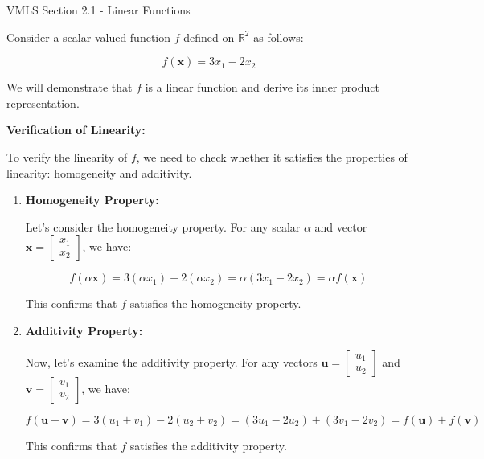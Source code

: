 \begin{notes}{VMLS Section 2.1 - Linear Functions}
\begin{highlight}
        Consider a scalar-valued function \(f\) defined on \(\mathbb{R}^2\) as follows:
        
        \[
        f(\mathbf{x}) = 3x_1 - 2x_2
        \]
        
        We will demonstrate that \(f\) is a linear function and derive its inner product representation.
        
        \vspace*{1em} \textbf{Verification of Linearity:} \vspace*{1em}
        
        To verify the linearity of \(f\), we need to check whether it satisfies the properties of linearity: homogeneity and additivity.
        
        \begin{enumerate}
            \item \textbf{Homogeneity Property:}
            
            Let's consider the homogeneity property. For any scalar \(\alpha\) and vector \(\mathbf{x} = \begin{bmatrix} x_1 \\ x_2 \end{bmatrix}\), we have:
            
            \[
            f(\alpha\mathbf{x}) = 3(\alpha x_1) - 2(\alpha x_2) = \alpha(3x_1 - 2x_2) = \alpha f(\mathbf{x})
            \]
            
            This confirms that \(f\) satisfies the homogeneity property.
            
            \item \textbf{Additivity Property:}
            
            Now, let's examine the additivity property. For any vectors \(\mathbf{u} = \begin{bmatrix} u_1 \\ u_2 \end{bmatrix}\) and \(\mathbf{v} = \begin{bmatrix} v_1 \\ v_2 \end{bmatrix}\), we have:
            
            \[
            f(\mathbf{u} + \mathbf{v}) = 3(u_1 + v_1) - 2(u_2 + v_2) = (3u_1 - 2u_2) + (3v_1 - 2v_2) = f(\mathbf{u}) + f(\mathbf{v})
            \]
            
            This confirms that \(f\) satisfies the additivity property.
        \end{enumerate}
        

\end{highlight}
\end{notes}
